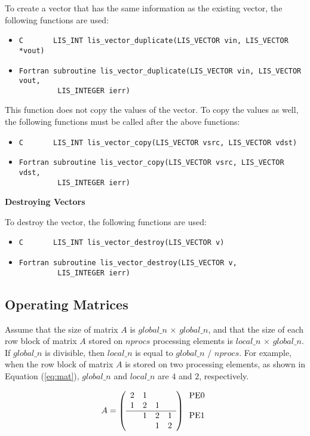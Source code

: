 \documentclass[a4paper]{article}
\begin{document}
To create a vector that has the same information as the existing vector, 
the following functions are used:
\begin{itemize}
\item \verb|C       LIS_INT lis_vector_duplicate(LIS_VECTOR vin, LIS_VECTOR *vout)|
\item \verb|Fortran subroutine lis_vector_duplicate(LIS_VECTOR vin, LIS_VECTOR vout,|\\
      \verb|         LIS_INTEGER ierr)|
\end{itemize}
This function does not copy the values of the vector. 
To copy the values as well, the following functions must be called after the above functions:
\begin{itemize}
\item \verb|C       LIS_INT lis_vector_copy(LIS_VECTOR vsrc, LIS_VECTOR vdst)|
\item \verb|Fortran subroutine lis_vector_copy(LIS_VECTOR vsrc, LIS_VECTOR vdst,|\\
      \verb|         LIS_INTEGER ierr)| 
\end{itemize}
\noindent
{\bf Destroying Vectors}

To destroy the vector, the following functions are used:
\begin{itemize}
\item \verb|C       LIS_INT lis_vector_destroy(LIS_VECTOR v)|
\item \verb|Fortran subroutine lis_vector_destroy(LIS_VECTOR v,|\\
      \verb|         LIS_INTEGER ierr)|
\end{itemize}

\subsection{Operating Matrices}
Assume that the size of matrix $A$ is 
$global\_n$ $\times$ $global\_n$, and that the size of each row block
of matrix $A$ stored on $nprocs$ processing elements is 
$local\_n$ $\times$ $global\_n$. 
If $global\_n$ is divisible, 
then $local\_n$ is equal to $global\_n$ $/$ $nprocs$. 
For example, when the row block of matrix $A$ is stored on two
processing elements, 
as shown in Equation (\ref{eq:mat}), $global\_n$ and $local\_n$ 
are $4$ and $2$, respectively.

\begin{equation}
\label{eq:mat}
A = 
\left(
\begin{array}{cccc}
2 & 1 &   &    \\
1 & 2 & 1 &    \\ \hline
  & 1 & 2 & 1 \\
  &   & 1 & 2 
\end{array}
\right)
\begin{array}{l}
\mbox{PE0} \\
    \\
\mbox{PE1} \\
   \\ 
\end{array}
\end{equation}
\end{document}
